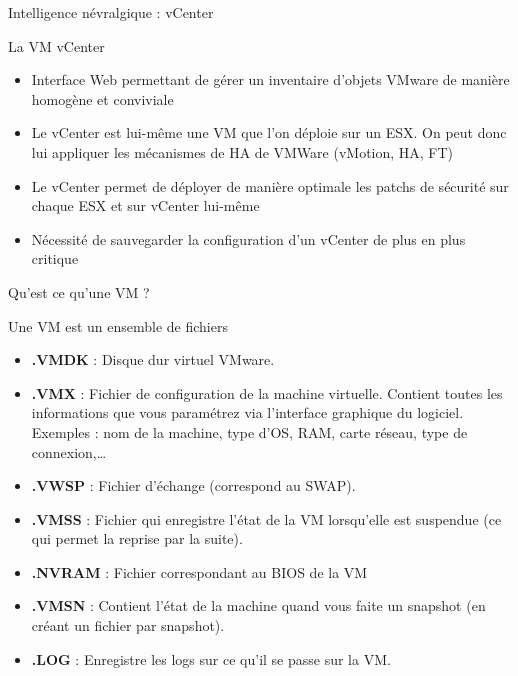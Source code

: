 \documentclass[10pt]{beamer}
\begin{document}
\begin{frame}{Intelligence névralgique : vCenter}
\begin{block}{La VM vCenter}
\begin{itemize}
\item Interface Web permettant de gérer un inventaire d’objets VMware de manière homogène et conviviale
\item Le vCenter est lui-même une VM que l’on déploie sur un ESX. On peut donc lui appliquer les mécanismes de HA de VMWare (vMotion, HA, FT)
\item Le vCenter permet de déployer de manière optimale les patchs de sécurité sur chaque ESX et sur vCenter lui-même
\item Nécessité de sauvegarder la configuration d’un vCenter de plus en plus critique
\end{itemize}
\end{block}
\end{frame}

\begin{frame}{Qu'est ce qu'une VM ?}
\begin{block}{Une VM est un ensemble de fichiers}
\begin{itemize}
\item \textbf{.VMDK} : Disque dur virtuel VMware. \pause
\item \textbf{.VMX }: Fichier de configuration de la machine virtuelle. Contient toutes les informations que vous paramétrez via l’interface graphique du logiciel. Exemples : nom de la machine, type d’OS, RAM, carte réseau, type de connexion,… \pause
\item \textbf{.VWSP} : Fichier d’échange (correspond au SWAP). \pause
\item \textbf{.VMSS} : Fichier qui enregistre l’état de la VM lorsqu’elle est suspendue (ce qui permet la reprise par la suite). \pause
\item \textbf{.NVRAM} : Fichier correspondant au BIOS de la VM   \pause
\item \textbf{.VMSN} : Contient l'état de la machine quand vous faite un snapshot (en créant un fichier par snapshot). \pause
\item \textbf{.LOG} : Enregistre les logs sur ce qu'il se passe sur la VM. 
\end{itemize}
\end{block} 
\end{frame}

\end{document}
